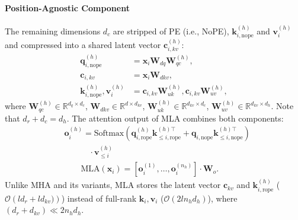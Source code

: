\paragraph{Position-Agnostic Component}
The remaining dimensions $d_c$ are stripped of PE (i.e., NoPE), $\bm{k}_{i,\text{nope}}^{(h)}$ and $\bm{v}_{i}^{(h)}$ and compressed into a shared latent vector $\bm{c}_{i,kv}^{(h)}$:
\begin{align}
   \bm{q}_{i,\text{nope}}^{(h)} &= \bm{x}_i \bm{W}_{dq} \bm{W}_{qc}^{(h)},\nonumber\\ \bm{c}_{i,kv} &= \bm{x}_i \bm{W}_{dkv}, \nonumber\\
   \bm{k}_{i,\text{nope}}^{(h)}, \bm{v}_{i}^{(h)} &= \bm{c}_{i,kv} \bm{W}_{uk}^{(h)}, \bm{c}_{i,kv} \bm{W}_{uv}^{(h)} \nonumber,
\end{align}
where $\bm{W}_{qc}^{(h)} \in \mathbb{R}^{d_q \times d_c}$, 
$\bm{W}_{dkv} \in \mathbb{R}^{d \times d_{kv}}$, 
$\bm{W}_{uk}^{(h)} \in \mathbb{R}^{d_{kv} \times d_c}$, 
$\bm{W}_{uv}^{(h)} \in \mathbb{R}^{d_{kv} \times d_h}$.
Note that $d_r+d_c = d_h$.
The attention output of MLA combines both components:  
\begin{align}    
    &\bm{o}_i^{(h)}=\text{Softm}\text{ax}\left(\bm{q}_{i,\text{rope}}^{(h)} \bm{k}_{\le i,\text{rope}}^{(h)\top}+\bm{q}_{i,\text{nope}} \bm{k}_{\le i,\text{nope}}^{(h)\top}\right) \nonumber\\
    &\quad \quad \quad \cdot \bm{v}_{\le i}^{(h)} \nonumber \\
    &\quad \quad \text{MLA}(\bm{x}_i) = \left[\bm{o}_i^{(1)}, \dots, \bm{o}_i^{(n_h)}\right] \cdot \bm{W}_o.
\end{align}
Unlike MHA and its variants, MLA stores the latent vector $\bm{c}_{kv}$ and $\bm{k}_{i,\text{rope}}^{(h)}$ (\( \mathcal{O}\left(ld_r+ld_{kv})\right) \)) instead of full-rank \( \bm{k}_i, \bm{v}_i \) (\( \mathcal{O}(2ln_hd_h) \)), where \( (d_r+d_{kv}) \ll 2n_hd_h \). 

